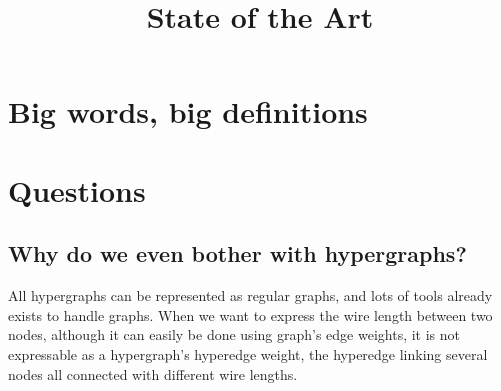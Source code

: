 \documentclass[12pt,a4paper]{article}
\title{State of the Art}
\theoremstyle{customdef}
\begin{document}
\maketitle
\tableofcontents







\section{Big words, big definitions}







\section{Questions}
\subsection{Why do we even bother with hypergraphs?}
All hypergraphs can be represented as regular graphs, and lots of tools already exists to handle graphs.
When we want to express the wire length between two nodes, although it can easily be done using graph's edge weights, it is not expressable as a hypergraph's hyperedge weight, the hyperedge linking several nodes all connected with different wire lengths.
\end{document}
